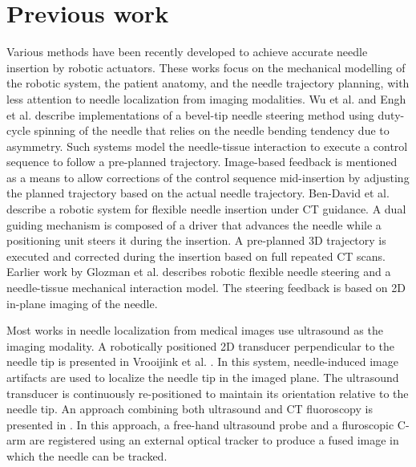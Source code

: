 \section{Previous work}
Various methods have been recently developed to achieve accurate needle insertion by robotic actuators. These works focus on the mechanical modelling of the robotic system, the patient anatomy, and the needle trajectory planning, with less attention to needle localization from imaging modalities.
Wu et al. \cite{wu2013automatic} and Engh et al. \cite{engh2010percutaneous} describe implementations of a bevel-tip needle steering method using duty-cycle spinning of the needle that relies on the needle bending tendency due to asymmetry. Such systems model the needle-tissue interaction to execute a control sequence to follow a pre-planned trajectory. Image-based feedback is mentioned as a means to allow corrections of the control sequence mid-insertion by adjusting the planned trajectory based on the actual needle trajectory.
Ben-David et al. \cite{ben2018robotic} describe a robotic system for flexible needle insertion under CT guidance. A dual guiding mechanism is composed of a driver that advances the needle while a positioning unit steers it during the insertion. A pre-planned 3D trajectory is executed and corrected during the insertion based on full repeated CT scans.
Earlier work by Glozman et al. \cite{glozman2007image} describes robotic flexible needle steering and a needle-tissue mechanical interaction model. The steering feedback is based on 2D in-plane imaging of the needle.

Most works in needle localization from medical images use ultrasound as the imaging modality. A robotically positioned 2D transducer perpendicular to the needle tip is presented in Vrooijink et al. \cite{vrooijink2013real}. In this system, needle-induced image artifacts are used to localize the needle tip in the imaged plane. The ultrasound transducer is continuously re-positioned to maintain its orientation relative to the needle tip. An approach combining both ultrasound and CT fluoroscopy is presented in \cite{marinetto2017integration}. In this approach, a free-hand ultrasound probe and a fluroscopic C-arm are registered using an external optical tracker to produce a fused image in which the needle can be tracked.

